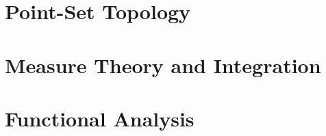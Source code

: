 \documentclass[11pt]{package2}
\begin{document}
\chapter{Point-Set Topology}\label{ch:point_set_topology}

\chapter{Measure Theory and Integration}\label{ch:measure_theory}

\chapter{Functional Analysis}\label{ch:functional_analysis}

\nocite{*}
\printbibliography
\end{document}
